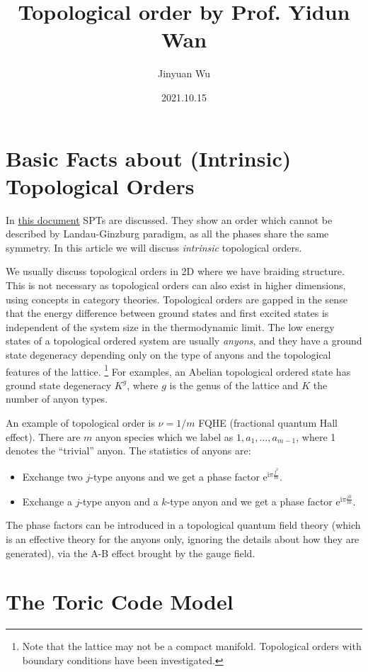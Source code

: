 \documentclass[hyperref, a4paper]{article}
\title{Topological order by Prof. Yidun Wan}
\author{Jinyuan Wu}
\date{2021.10.15}
\newcommand*{\ii}{\mathrm{i}}
\newcommand*{\ee}{\mathrm{e}}
\begin{document}
\maketitle

\section{Basic Facts about (Intrinsic) Topological Orders}

In \href{./2021-10-8}{this document} SPTs are discussed. 
They show an order which cannot be described by Landau-Ginzburg paradigm, as all the phases share the same symmetry. 
In this article we will discuss \emph{intrinsic} topological orders.

We usually discuss topological orders in 2D where we have braiding structure. 
This is not necessary as topological orders can also exist in higher dimensions, using concepts in category theories.
Topological orders are gapped in the sense that the energy difference between ground states and first excited states is independent of the system size in the thermodynamic limit.
The low energy states of a topological ordered system are usually \emph{anyons}, 
and they have a ground state degeneracy depending only on the type of anyons and the topological features of the lattice.%
\footnote{
    Note that the lattice may not be a compact manifold. Topological orders with boundary conditions have been investigated.
}%
For examples, an Abelian topological ordered state has ground state degeneracy $K^g$, where $g$ is the genus of the lattice and $K$ the number of anyon types.

An example of topological order is $\nu = 1 / m$ FQHE (fractional quantum Hall effect). There are $m$ anyon species which we label as $1, a_1, \ldots, a_{m-1}$, where 1 denotes the ``trivial'' anyon.
The statistics of anyons are:
\begin{itemize}
    \item Exchange two $j$-type anyons and we get a phase factor $\ee^{\ii \pi \frac{j^2}{m}}$.
    \item Exchange a $j$-type anyon and a $k$-type anyon and we get a phase factor $\ee^{\ii \pi \frac{jk}{m}}$.
\end{itemize}
The phase factors can be introduced in a topological quantum field theory (which is an effective theory for the anyons only, ignoring the details about how they are generated), via the A-B effect brought by the gauge field.

\section{The Toric Code Model}
\end{document}
